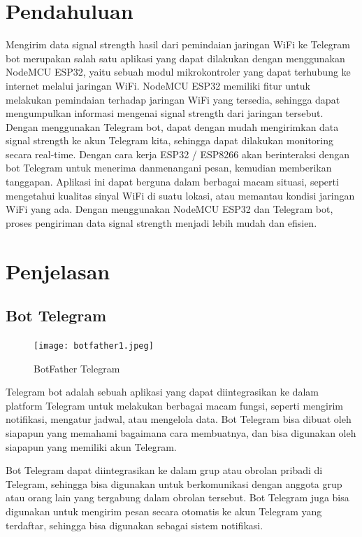 \documentclass[conference]{IEEEtran}
\begin{document}
\section{Pendahuluan}
Mengirim data signal strength hasil dari pemindaian jaringan WiFi ke Telegram bot merupakan salah satu aplikasi yang dapat dilakukan dengan menggunakan NodeMCU ESP32, yaitu sebuah modul mikrokontroler yang dapat terhubung ke internet melalui jaringan WiFi. NodeMCU ESP32 memiliki fitur untuk melakukan pemindaian terhadap jaringan WiFi yang tersedia, sehingga dapat mengumpulkan informasi mengenai signal strength dari jaringan tersebut. Dengan menggunakan Telegram bot, dapat dengan mudah mengirimkan data signal strength ke akun Telegram kita, sehingga dapat dilakukan monitoring secara real-time. Dengan cara kerja ESP32 / ESP8266 akan berinteraksi dengan bot Telegram untuk menerima danmenangani pesan, kemudian memberikan tanggapan. Aplikasi ini dapat berguna dalam berbagai macam situasi, seperti mengetahui kualitas sinyal WiFi di suatu lokasi, atau memantau kondisi jaringan WiFi yang ada. Dengan menggunakan NodeMCU ESP32 dan Telegram bot, proses pengiriman data signal strength menjadi lebih mudah dan efisien.

\section{Penjelasan}
\subsection{Bot Telegram}
\vspace{0.2cm}
\begin{figure}[h]
    \centering
    \texttt{[image: botfather1.jpeg]}
    \caption{BotFather Telegram}
\end{figure}

Telegram bot adalah sebuah aplikasi yang dapat diintegrasikan ke dalam platform Telegram untuk melakukan berbagai macam fungsi, seperti mengirim notifikasi, mengatur jadwal, atau mengelola data. Bot Telegram bisa dibuat oleh siapapun yang memahami bagaimana cara membuatnya, dan bisa digunakan oleh siapapun yang memiliki akun Telegram.

Bot Telegram dapat diintegrasikan ke dalam grup atau obrolan pribadi di Telegram, sehingga bisa digunakan untuk berkomunikasi dengan anggota grup atau orang lain yang tergabung dalam obrolan tersebut. Bot Telegram juga bisa digunakan untuk mengirim pesan secara otomatis ke akun Telegram yang terdaftar, sehingga bisa digunakan sebagai sistem notifikasi.
\end{document}
